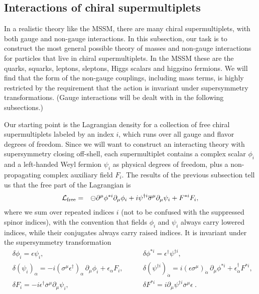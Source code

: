 \documentclass[12pt]{article}
\renewcommand{\theequation}{\arabic{section}.\arabic{equation}}
\def\BDpos{}
\def\BDpos{-}
\def\BDpos{\oplus}
\def\BDpos{\ominus}
\def\beq{\begin{eqnarray}}
\def\eeq{\end{eqnarray}}
\def\lagr{{\cal L}}
\def\deltaeps{\delta}
\def\sigmabar{\overline\sigma}
\begin{document}
\subsection{Interactions of chiral supermultiplets}\label{subsec:susylagr.chiral}
\setcounter{footnote}{1}
\renewcommand{\theequation}{\arabic{section}.\arabic{subsection}.\arabic{equation}}
\setcounter{equation}{0}

In a realistic theory like the MSSM, there are many chiral
supermultiplets, with both gauge and non-gauge interactions. In this
subsection, our task is to construct the most general possible theory of
masses and non-gauge interactions for particles that live in chiral
supermultiplets. In the MSSM these are the quarks, squarks, leptons,
sleptons, Higgs scalars and higgsino fermions. We will find that the form
of the non-gauge couplings, including mass terms, is highly restricted by
the requirement that the action is invariant under supersymmetry
transformations. (Gauge interactions will be dealt with in the following
subsections.)

Our starting point is the Lagrangian density for a collection of free
chiral supermultiplets labeled by an index $i$, which runs over all gauge
and flavor degrees of freedom. Since we will want to construct an
interacting theory with supersymmetry closing off-shell, each
supermultiplet contains a complex scalar $\phi_i$ and a left-handed Weyl
fermion $\psi_i$ as physical degrees of freedom, plus a non-propagating 
complex auxiliary
field $F_i$. The results of the previous
subsection tell us that the free part of the Lagrangian is
\beq
\lagr_{\rm free} &=&
\BDpos \partial^\mu \phi^{*i} \partial_\mu \phi_i
+ i {\psi}^{\dagger i} \sigmabar^\mu \partial_\mu \psi_i
+ F^{*i} F_i ,
\label{lagrfree}
\eeq
where we sum over repeated indices $i$ (not to be confused with the
suppressed spinor indices), with the convention that fields $\phi_i$ and
$\psi_i$ always carry lowered indices, while their conjugates always carry
raised indices. It is invariant under the supersymmetry transformation
\beq
&
\delta \phi_i = \epsilon\psi_i ,
\qquad\>\>\>\>\>\qquad\qquad\qquad
\phantom{xxxi}
&
\delta \phi^{*i} = \epsilon^\dagger {\psi}^{\dagger i} ,
\label{phitran}
\\
&
\delta (\psi_i)_\alpha = 
- i (\sigma^\mu {\epsilon^\dagger})_{\alpha}\, \partial_\mu
\phi_i + \epsilon_\alpha F_i ,
\qquad
&
\delta ({\psi}^{\dagger i})_{\dot{\alpha}}=
 i (\epsilon\sigma^\mu)_{\dot{\alpha}}\, \partial_\mu
\phi^{*i} + \epsilon^\dagger_{\dot{\alpha}} F^{*i} ,
\phantom{xxxx}
\\
&
\delta F_i = - i \epsilon^\dagger \sigmabar^\mu\partial_\mu \psi_i ,
\qquad\qquad\qquad
\phantom{xxi}
&
\deltaeps F^{* i} = 
 i\partial_\mu {\psi}^{\dagger i} \sigmabar^\mu  \epsilon\> .
\phantom{xxx}
\label{eq:Ftran}
\eeq
\end{document}
